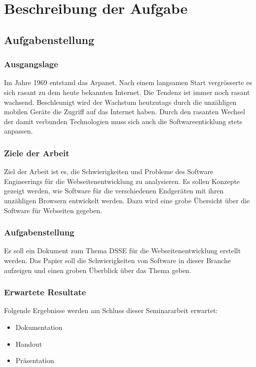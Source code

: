 \chapter{Beschreibung der Aufgabe}

\section{Aufgabenstellung}

\subsection{Ausgangslage}
Im Jahre 1969 entstand das Arpanet. Nach einem langsamen Start vergrösserte es sich rasant zu dem heute bekannten Internet. Die Tendenz ist immer noch rasant wachsend. Beschleunigt wird der Wachstum heutzutags durch die unzähligen mobilen Geräte die Zugriff auf das Internet haben. Durch den rasanten Wechsel der damit verbunden Technologien muss sich auch die Softwareenticklung stets anpassen.

\subsection{Ziele der Arbeit}
Ziel der Arbeit ist es, die Schwierigkeiten und Probleme des Software Engineerings für die Webseitenentwicklung zu analysieren. Es sollen Konzepte gezeigt werden, wie Software für die verschiedenen Endgeräten mit ihren unzähligen Browsern entwickelt werden. Dazu wird eine grobe Übersicht über die Software für Webseiten gegeben.

\subsection{Aufgabenstellung}
Es soll ein Dokument zum Thema DSSE für die Webseitenentwicklung erstellt werden. Das Papier soll die Schwierigkeiten von Software in dieser Branche aufzeigen und einen groben Überblick über das Thema geben.

\subsection{Erwartete Resultate}
Folgende Ergebnisse werden am Schluss dieser Seminararbeit erwartet:
\begin{itemize}
\item Dokumentation
\item Handout
\item Präsentation
\end{itemize}